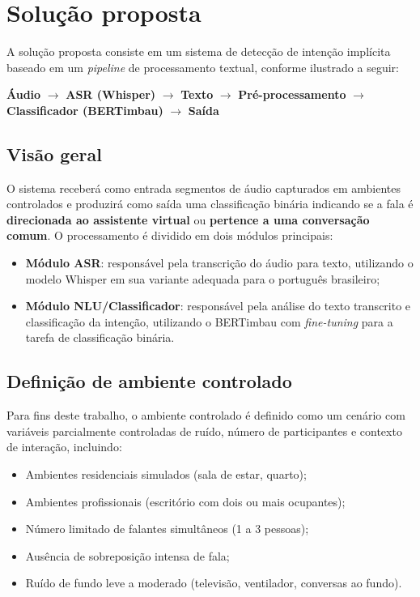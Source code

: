\documentclass[
    12pt,                %
    openright,           %
    oneside,             %
    a4paper,             %
    english,             %
    brazil               %
]{abntex2}
\begin{document}
\section{Solução proposta}
\label{sec:solucao}

A solução proposta consiste em um sistema de detecção de intenção implícita baseado em um \textit{pipeline} de processamento textual, conforme ilustrado a seguir:

\begin{center}
\textbf{Áudio} $\rightarrow$ \textbf{ASR (Whisper)} $\rightarrow$ \textbf{Texto} $\rightarrow$ \textbf{Pré-processamento} $\rightarrow$ \textbf{Classificador (BERTimbau)} $\rightarrow$ \textbf{Saída}
\end{center}

\subsection{Visão geral}

O sistema receberá como entrada segmentos de áudio capturados em ambientes controlados e produzirá como saída uma classificação binária indicando se a fala é \textbf{direcionada ao assistente virtual} ou \textbf{pertence a uma conversação comum}. O processamento é dividido em dois módulos principais:

\begin{itemize}
    \item \textbf{Módulo ASR}: responsável pela transcrição do áudio para texto, utilizando o modelo Whisper \cite{Radford2023} em sua variante adequada para o português brasileiro;
    \item \textbf{Módulo NLU/Classificador}: responsável pela análise do texto transcrito e classificação da intenção, utilizando o BERTimbau \cite{Souza2020} com \textit{fine-tuning} para a tarefa de classificação binária.
\end{itemize}

\subsection{Definição de ambiente controlado}

Para fins deste trabalho, o ambiente controlado é definido como um cenário com variáveis parcialmente controladas de ruído, número de participantes e contexto de interação, incluindo:

\begin{itemize}
    \item Ambientes residenciais simulados (sala de estar, quarto);
    \item Ambientes profissionais (escritório com dois ou mais ocupantes);
    \item Número limitado de falantes simultâneos (1 a 3 pessoas);
    \item Ausência de sobreposição intensa de fala;
    \item Ruído de fundo leve a moderado (televisão, ventilador, conversas ao fundo).
\end{itemize}
\end{document}
